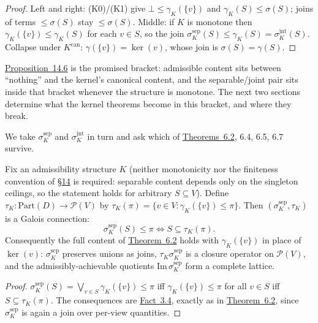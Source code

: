 \begin{proof}

Left and right: (K0)/(K1) give \(\bot\le\gamma_K(\{v\})\) and \(\gamma_K(S)\le\sigma(S)\); joins of terms \(\le\sigma(S)\) stay \(\le\sigma(S)\). Middle: if \(K\) is monotone then \(\gamma_K(\{v\})\le\gamma_K(S)\) for each \(v\in S\), so the join \(\sigma^{\mathrm{sep}}_K(S)\le\gamma_K(S)=\sigma^{\mathrm{jnt}}_K(S)\). Collapse under \(K^{\mathrm{can}}\): \(\gamma(\{v\})=\ker(v)\), whose join is \(\sigma(S)=\gamma(S)\).
\end{proof}

\hyperlink{stmt:14.6}{Proposition~14.6} is the promised bracket: admissible content sits between ``nothing'' and the kernel's canonical content, and the separable/joint pair sits inside that bracket whenever the structure is monotone. The next two sections determine what the kernel theorems become in this bracket, and where they break.


We take \(\sigma^{\mathrm{sep}}_K\) and \(\sigma^{\mathrm{jnt}}_K\) in turn and ask which of \hyperlink{stmt:6.2}{Theorems~6.2}, 6.4, 6.5, 6.7 survive.


\begin{thmplain}

Fix an admissibility structure \(K\) (neither monotonicity nor the finiteness convention of \hyperlink{sec:14}{§14} is required: separable content depends only on the singleton ceilings, so the statement holds for arbitrary \(S \subseteq V\)). Define \(\tau_K:\mathrm{Part}(D)\to\mathcal P(V)\) by \(\tau_K(\pi)=\{v\in V:\gamma_K(\{v\})\le\pi\}\). Then \((\sigma^{\mathrm{sep}}_K,\tau_K)\) is a Galois connection:
\[
\sigma^{\mathrm{sep}}_K(S)\le\pi\iff S\subseteq\tau_K(\pi).
\]
Consequently the full content of \hyperlink{stmt:6.2}{Theorem~6.2} holds with \(\gamma_K(\{v\})\) in place of \(\ker(v)\): \(\sigma^{\mathrm{sep}}_K\) preserves unions as joins, \(\tau_K\sigma^{\mathrm{sep}}_K\) is a closure operator on \(\mathcal P(V)\), and the admissibly-achievable quotients \(\mathrm{Im}\,\sigma^{\mathrm{sep}}_K\) form a complete lattice.
\end{thmplain}

\begin{proof}

\(\sigma^{\mathrm{sep}}_K(S)=\bigvee_{v\in S}\gamma_K(\{v\})\le\pi\) iff \(\gamma_K(\{v\})\le\pi\) for all \(v\in S\) iff \(S\subseteq\tau_K(\pi)\). The consequences are \hyperlink{stmt:3.4}{Fact~3.4}, exactly as in \hyperlink{stmt:6.2}{Theorem~6.2}, since \(\sigma^{\mathrm{sep}}_K\) is again a join over per-view quantities.
\end{proof}

